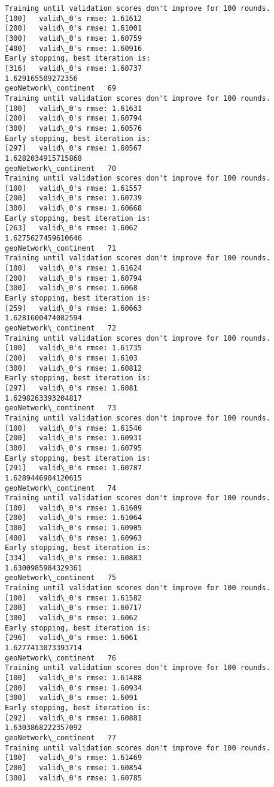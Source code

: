 \documentclass[11pt]{article}
\begin{document}
\begin{Verbatim}[commandchars=\\\{\}]
Training until validation scores don't improve for 100 rounds.
[100]	valid\_0's rmse: 1.61612
[200]	valid\_0's rmse: 1.61001
[300]	valid\_0's rmse: 1.60759
[400]	valid\_0's rmse: 1.60916
Early stopping, best iteration is:
[316]	valid\_0's rmse: 1.60737
1.629165509272356
geoNetwork\_continent   69
Training until validation scores don't improve for 100 rounds.
[100]	valid\_0's rmse: 1.61631
[200]	valid\_0's rmse: 1.60794
[300]	valid\_0's rmse: 1.60576
Early stopping, best iteration is:
[297]	valid\_0's rmse: 1.60567
1.6282034915715868
geoNetwork\_continent   70
Training until validation scores don't improve for 100 rounds.
[100]	valid\_0's rmse: 1.61557
[200]	valid\_0's rmse: 1.60739
[300]	valid\_0's rmse: 1.60668
Early stopping, best iteration is:
[263]	valid\_0's rmse: 1.6062
1.6275627459610646
geoNetwork\_continent   71
Training until validation scores don't improve for 100 rounds.
[100]	valid\_0's rmse: 1.61624
[200]	valid\_0's rmse: 1.60794
[300]	valid\_0's rmse: 1.6068
Early stopping, best iteration is:
[259]	valid\_0's rmse: 1.60663
1.6281600474082594
geoNetwork\_continent   72
Training until validation scores don't improve for 100 rounds.
[100]	valid\_0's rmse: 1.61735
[200]	valid\_0's rmse: 1.6103
[300]	valid\_0's rmse: 1.60812
Early stopping, best iteration is:
[297]	valid\_0's rmse: 1.6081
1.6298263393204817
geoNetwork\_continent   73
Training until validation scores don't improve for 100 rounds.
[100]	valid\_0's rmse: 1.61546
[200]	valid\_0's rmse: 1.60931
[300]	valid\_0's rmse: 1.60795
Early stopping, best iteration is:
[291]	valid\_0's rmse: 1.60787
1.6289446904120615
geoNetwork\_continent   74
Training until validation scores don't improve for 100 rounds.
[100]	valid\_0's rmse: 1.61609
[200]	valid\_0's rmse: 1.61064
[300]	valid\_0's rmse: 1.60905
[400]	valid\_0's rmse: 1.60963
Early stopping, best iteration is:
[334]	valid\_0's rmse: 1.60883
1.6300985984329361
geoNetwork\_continent   75
Training until validation scores don't improve for 100 rounds.
[100]	valid\_0's rmse: 1.61582
[200]	valid\_0's rmse: 1.60717
[300]	valid\_0's rmse: 1.6062
Early stopping, best iteration is:
[296]	valid\_0's rmse: 1.6061
1.6277413073393714
geoNetwork\_continent   76
Training until validation scores don't improve for 100 rounds.
[100]	valid\_0's rmse: 1.61488
[200]	valid\_0's rmse: 1.60934
[300]	valid\_0's rmse: 1.6091
Early stopping, best iteration is:
[292]	valid\_0's rmse: 1.60881
1.6303868222357092
geoNetwork\_continent   77
Training until validation scores don't improve for 100 rounds.
[100]	valid\_0's rmse: 1.61469
[200]	valid\_0's rmse: 1.60854
[300]	valid\_0's rmse: 1.60785

\end{Verbatim}
\end{document}
